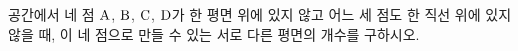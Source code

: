 공간에서 네 점 $\mathrm{A}$, $\mathrm{B}$, $\mathrm{C}$, $\mathrm{D}$가 한 평면 위에 있지 않고 어느 세 점도 한 직선 위에 있지 않을 때, 이 네 점으로 만들 수 있는 서로 다른 평면의 개수를 구하시오.
